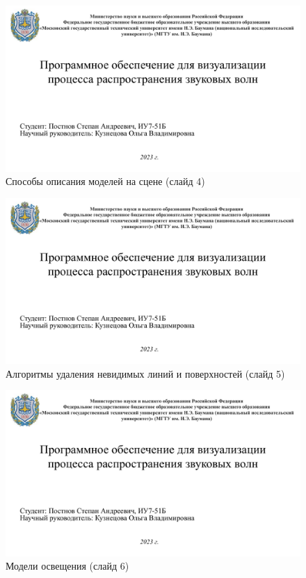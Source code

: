 \begin{figure}[h]
\centering
\includegraphics[height=0.5\textheight, page=4, angle=90]{inc/img/pres.pdf}
\caption{Способы описания моделей на сцене (слайд 4)}
\end{figure}
\begin{figure}[h]
\centering
\includegraphics[height=0.5\textheight, page=5, angle=90]{inc/img/pres.pdf}
\caption{Алгоритмы удаления невидимых линий и поверхностей (слайд 5)}
\end{figure}
\begin{figure}[h]
\centering
\includegraphics[height=0.5\textheight, page=6, angle=90]{inc/img/pres.pdf}
\caption{Модели освещения (слайд 6)}
\end{figure}
